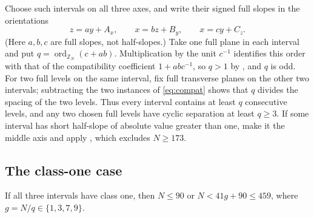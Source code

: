 \documentclass[11pt,colorlinks]{charlie}
\newcommand{\ZN}{\mathbb{Z}_N}
\begin{document}
Choose such intervals on all three axes, and write their signed full slopes in the orientations
\[
 z=ay+A_x,\qquad x=bz+B_y,\qquad x=cy+C_z .
\]
(Here $a,b,c$ are full slopes, not half-slopes.) Take one full plane in each interval and put $q=\operatorname{ord}_{\ZN}(c+ab)$. Multiplication by the unit $c^{-1}$ identifies this order with that of the compatibility coefficient $1+abc^{-1}$, so $q>1$ by \cite[Lemmas~12 and~13]{BHN}, and $q$ is odd. For two full levels on the same interval, fix full transverse planes on the other two intervals; subtracting the two instances of \eqref{eq:compat} shows that $q$ divides the spacing of the two levels. Thus every interval contains at least $q$ consecutive levels, and any two chosen full levels have cyclic separation at least $q\ge3$. If some interval has short half-slope of absolute value greater than one, make it the middle axis and apply , which excludes $N\ge173$.

\subsection{The class-one case}

\begin{lemma}\label{lem:classone}
If all three intervals have class one, then $N\le90$ or $N<41g+90\le459$, where $g=N/q\in\{1,3,7,9\}$.
\end{lemma}
\end{document}
